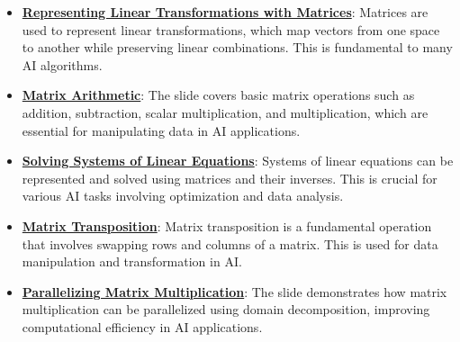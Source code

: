 \documentclass{article}%
\begin{document}
\begin{itemize}[leftmargin=*]%
\item \href{https://purdue.brightspace.com/d2l/common/assets/pdfjs-d2l-dist/1.0.14-legacy/web/viewer.html?file=%2Fcontent%2Fenforced%2F1095467-wl.202510.CS.24300.001%2F04L1-Linear Algebra Primer.pdf%3Fou%3D1095467&lang=en-us&container=d2l-fileviewer-rendered-pdf&fullscreen=d2l-fileviewer-rendered-pdf-dialog&height=667#page=5}{\textbf{Representing Linear Transformations with Matrices}}: Matrices are used to represent linear transformations, which map vectors from one space to another while preserving linear combinations. This is fundamental to many AI algorithms.%
\item \href{https://purdue.brightspace.com/d2l/common/assets/pdfjs-d2l-dist/1.0.14-legacy/web/viewer.html?file=%2Fcontent%2Fenforced%2F1095467-wl.202510.CS.24300.001%2F04L1-Linear Algebra Primer.pdf%3Fou%3D1095467&lang=en-us&container=d2l-fileviewer-rendered-pdf&fullscreen=d2l-fileviewer-rendered-pdf-dialog&height=667#page=9}{\textbf{Matrix Arithmetic}}: The slide covers basic matrix operations such as addition, subtraction, scalar multiplication, and multiplication, which are essential for manipulating data in AI applications.%
\item \href{https://purdue.brightspace.com/d2l/common/assets/pdfjs-d2l-dist/1.0.14-legacy/web/viewer.html?file=%2Fcontent%2Fenforced%2F1095467-wl.202510.CS.24300.001%2F04L1-Linear Algebra Primer.pdf%3Fou%3D1095467&lang=en-us&container=d2l-fileviewer-rendered-pdf&fullscreen=d2l-fileviewer-rendered-pdf-dialog&height=667#page=11}{\textbf{Solving Systems of Linear Equations}}: Systems of linear equations can be represented and solved using matrices and their inverses. This is crucial for various AI tasks involving optimization and data analysis.%
\item \href{https://purdue.brightspace.com/d2l/common/assets/pdfjs-d2l-dist/1.0.14-legacy/web/viewer.html?file=%2Fcontent%2Fenforced%2F1095467-wl.202510.CS.24300.001%2F04L1-Linear Algebra Primer.pdf%3Fou%3D1095467&lang=en-us&container=d2l-fileviewer-rendered-pdf&fullscreen=d2l-fileviewer-rendered-pdf-dialog&height=667#page=16}{\textbf{Matrix Transposition}}: Matrix transposition is a fundamental operation that involves swapping rows and columns of a matrix. This is used for data manipulation and transformation in AI.%
\item \href{https://purdue.brightspace.com/d2l/common/assets/pdfjs-d2l-dist/1.0.14-legacy/web/viewer.html?file=%2Fcontent%2Fenforced%2F1095467-wl.202510.CS.24300.001%2F04L1-Linear Algebra Primer.pdf%3Fou%3D1095467&lang=en-us&container=d2l-fileviewer-rendered-pdf&fullscreen=d2l-fileviewer-rendered-pdf-dialog&height=667#page=18}{\textbf{Parallelizing Matrix Multiplication}}: The slide demonstrates how matrix multiplication can be parallelized using domain decomposition, improving computational efficiency in AI applications.%

\end{itemize}
\end{document}
